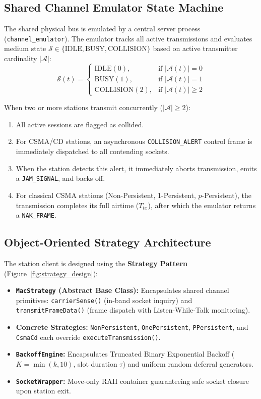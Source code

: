 \documentclass[11pt,a4paper]{article}
\begin{document}
\subsection{Shared Channel Emulator State Machine}
The shared physical bus is emulated by a central server process (\texttt{channel\_emulator}). The emulator tracks all active transmissions and evaluates medium state $\mathcal{S} \in \{\text{IDLE}, \text{BUSY}, \text{COLLISION}\}$ based on active transmitter cardinality $|\mathcal{A}|$:
\begin{equation}
    \mathcal{S}(t) = 
    \begin{cases}
        \text{IDLE} (0), & \text{if } |\mathcal{A}(t)| = 0 \\
        \text{BUSY} (1), & \text{if } |\mathcal{A}(t)| = 1 \\
        \text{COLLISION} (2), & \text{if } |\mathcal{A}(t)| \ge 2
    \end{cases}
\end{equation}

When two or more stations transmit concurrently ($|\mathcal{A}| \ge 2$):
\begin{enumerate}[leftmargin=1.2em]
    \item All active sessions are flagged as collided.
    \item For CSMA/CD stations, an asynchronous \texttt{COLLISION\_ALERT} control frame is immediately dispatched to all contending sockets.
    \item When the station detects this alert, it immediately aborts transmission, emits a \texttt{JAM\_SIGNAL}, and backs off.
    \item For classical CSMA stations (Non-Persistent, 1-Persistent, $p$-Persistent), the transmission completes its full airtime ($T_{tx}$), after which the emulator returns a \texttt{NAK\_FRAME}.
\end{enumerate}

\subsection{Object-Oriented Strategy Architecture}
The station client is designed using the \textbf{Strategy Pattern} (Figure~\ref{fig:strategy_design}):
\begin{itemize}[leftmargin=1.2em]
    \item \textbf{\texttt{MacStrategy} (Abstract Base Class):} Encapsulates shared channel primitives: \texttt{carrierSense()} (in-band socket inquiry) and \texttt{transmitFrameData()} (frame dispatch with Listen-While-Talk monitoring).
    \item \textbf{Concrete Strategies:} \texttt{NonPersistent}, \texttt{OnePersistent}, \texttt{PPersistent}, and \texttt{CsmaCd} each override \texttt{executeTransmission()}.
    \item \textbf{\texttt{BackoffEngine}:} Encapsulates Truncated Binary Exponential Backoff ($K = \min(k, 10)$, slot duration $\tau$) and uniform random deferral generators.
    \item \textbf{\texttt{SocketWrapper}:} Move-only RAII container guaranteeing safe socket closure upon station exit.
\end{itemize}
\end{document}
